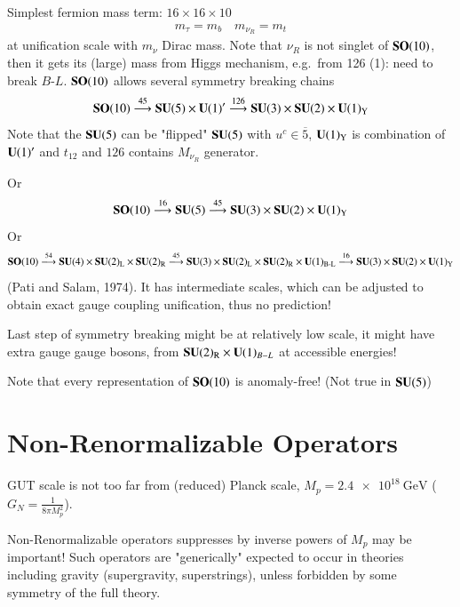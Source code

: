 Simplest fermion mass term: $16\times 16 \times 10$
\begin{align}
   m_\tau = m_b \quad m_{\nu_R} = m_t \label{2.52}
\end{align}
at unification scale with $m_{\nu}$ Dirac mass. Note that $\nu_R$ is not singlet of $\mathbf{SO}(10)$, then it gets its (large) mass from Higgs mechanism, e.g.~from 126 (1): need to break $B$-$L$. $\mathbf{SO}(10)$ allows several symmetry breaking chains
\begin{equation}
   \mathbf{SO}(10) \stackrel{45}{\longrightarrow} \mathbf{SU}(5) \times \mathbf{U}(1)' \stackrel{126}{\longrightarrow} \mathbf{SU}(3) \times \mathbf{SU}(2) \times \mathbf{U}(1)_\text{Y} \label{2.53}
\end{equation}
Note that the $\mathbf{SU}(5)$ can be "flipped" $\mathbf{SU}(5)$ with $u^c \in \overline{5}$, $\mathbf{U}(1)_\text{Y}$ is combination of $\mathbf{U}(1)'$ and $t_{12}$ and $126$ contains $M_{\nu_R}$ generator.

Or
\begin{equation}
   \mathbf{SO}(10) \stackrel{16}{\longrightarrow} \mathbf{SU}(5) \stackrel{45}{\longrightarrow} \mathbf{SU}(3) \times \mathbf{SU}(2) \times \mathbf{U}(1)_\text{Y} \label{2.54}
\end{equation}
Or
\begin{equation}
   \mathbf{SO}(10) \stackrel{54}{\longrightarrow} \mathbf{SU}(4) \times \mathbf{SU}(2)_\text{L} \times \mathbf{SU}(2)_\text{R} \stackrel{45}{\longrightarrow} \mathbf{SU}(3) \times \mathbf{SU}(2)_\text{L}\times \mathbf{SU}(2)_\text{R} \times \mathbf{U}(1)_\text{B-L} \stackrel{16}{\longrightarrow} \mathbf{SU}(3) \times \mathbf{SU}(2) \times \mathbf{U}(1)_\text{Y} \label{2.55}
\end{equation}
(Pati and Salam, 1974). It has intermediate scales, which can be adjusted to obtain exact gauge coupling unification, thus no prediction!

Last step of symmetry breaking might be at relatively low scale, it might have extra gauge gauge bosons, from $\mathbf{SU}(2)_\text{R} \times \mathbf{U}(1)_{B-L}$ at accessible energies!

Note that every representation of $\mathbf{SO}(10)$ is anomaly-free! (Not true in $\mathbf{SU}(5)$)

\section{Non-Renormalizable Operators}
GUT scale is not too far from (reduced) Planck scale, $M_p = \SI{2.4e18}{\giga \eV}$ ($G_N = \frac{1}{8\pi M_p^2}$).

Non-Renormalizable operators suppresses by inverse powers of $M_p$ may be important! Such operators are "generically" expected to occur in theories including gravity (supergravity, superstrings), unless forbidden by some symmetry of the full theory.

